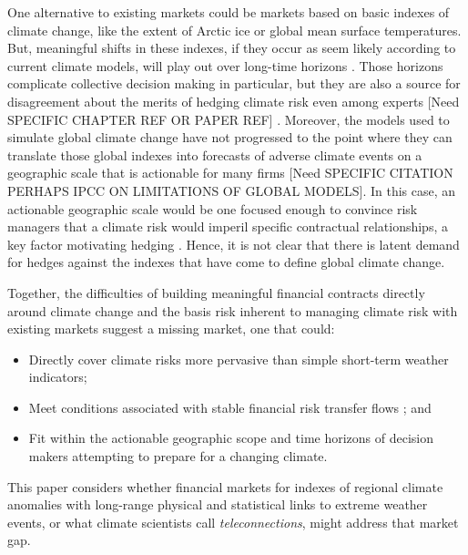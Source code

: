 \documentclass[authoryear]{article}
\begin{document}
One alternative to existing markets could be markets based on basic indexes of climate change, like the extent of Arctic ice or global mean surface temperatures. But, meaningful shifts in these indexes, if they occur as seem likely according to current climate models, will play out over long-time horizons \cite{ipcc2013fifthReport}. Those horizons complicate collective decision making in particular, but they are also a source for disagreement about the merits of hedging climate risk even among experts \cite{jacquet2013intra} \cite{nordhaus2013}[Need SPECIFIC CHAPTER REF OR PAPER REF] \cite{pindyck2013}. Moreover, the models used to simulate global climate change have not progressed to the point where they can translate those global indexes into forecasts of adverse climate events on a geographic scale that is actionable for many firms [Need SPECIFIC CITATION PERHAPS IPCC ON LIMITATIONS OF GLOBAL MODELS]. In this case, an actionable geographic scale would be one focused enough to convince risk managers that a climate risk would imperil specific contractual relationships, a key factor motivating hedging \cite{pennings2000motivation} \cite{pennings2001behavioural}. Hence, it is not clear that there is latent demand for hedges against the indexes that have come to define global climate change.

Together, the difficulties of building meaningful financial contracts directly around climate change and the basis risk inherent to managing climate risk with existing markets suggest a missing market, one that could:

\begin{itemize}
\item Directly cover climate risks more pervasive than simple short-term weather indicators;
\item Meet conditions associated with stable financial risk transfer flows \cite{working1953futures} \cite{silber1981innovation} \cite{carlton1984futures} \cite{black1986success} \cite{duffie1989optimal} \cite{tashjian1995optimal} \cite{pennings1999commodity} \cite{brorsen2001success} \cite{gorham12} \cite{sandor2012}; and
\item Fit within the actionable geographic scope and time horizons of decision makers attempting to prepare for a changing climate. 
\end{itemize}

This paper considers whether financial markets for indexes of regional climate anomalies with long-range physical and statistical links to extreme weather events, or what climate scientists call \emph{teleconnections}, might address that market gap. 
\end{document}
